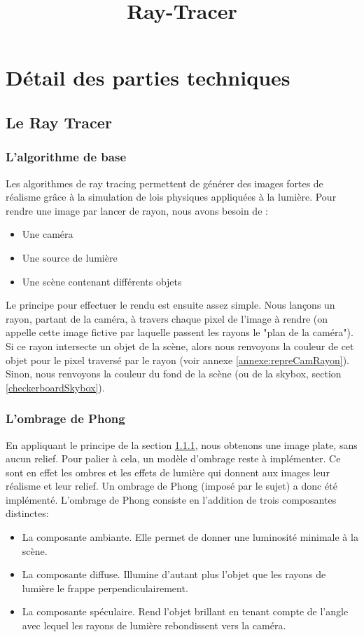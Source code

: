 \documentclass[11pt]{article}
\author{}
\title{Ray-Tracer}
\date{}
\begin{document}
\tableofcontents
\newpage

\maketitle

\section{Détail des parties techniques}
\subsection{Le Ray Tracer}
\subsubsection{L'algorithme de base}
\label{rayTracingBase}
Les algorithmes de ray tracing permettent de générer des images fortes de réalisme grâce à la simulation de lois physiques appliquées à la lumière. Pour rendre une image par lancer de rayon, nous avons besoin de :
\begin{itemize}
	\item {Une caméra}
	\item {Une source de lumière}
	\item{Une scène contenant différents objets}
\end{itemize}
Le principe pour effectuer le rendu est ensuite assez simple. Nous lançons un rayon, partant de la caméra, à travers chaque pixel de l'image à rendre (on appelle cette image fictive par laquelle passent les rayons le "plan de la caméra"). Si ce rayon intersecte un objet de la scène, alors nous renvoyons la couleur de cet objet pour le pixel traversé par le rayon (voir annexe \ref{annexe:repreCamRayon}). Sinon, nous renvoyons la couleur du fond de la scène (ou de la skybox, section \ref{checkerboardSkybox}).
\subsubsection{L'ombrage de Phong}
\label{ombragePhong}

En appliquant le principe de la section \ref{rayTracingBase}, nous obtenons une image plate, sans aucun relief. Pour palier à cela, un modèle d'ombrage reste à implémenter. Ce sont en effet les ombres et les effets de lumière qui donnent aux images leur réalisme et leur relief. Un ombrage de Phong (imposé par le sujet) a donc été implémenté. L'ombrage de Phong consiste en l'addition de trois composantes distinctes:
\begin{itemize}
	\item {La composante ambiante. Elle permet de donner une luminosité minimale à la scène.}
	\item {La composante diffuse. Illumine d'autant plus l'objet que les rayons de lumière le frappe perpendiculairement.}
	\item {La composante spéculaire. Rend l'objet brillant en tenant compte de l'angle avec lequel les rayons de lumière rebondissent vers la caméra.}
\end{itemize}
\end{document}
